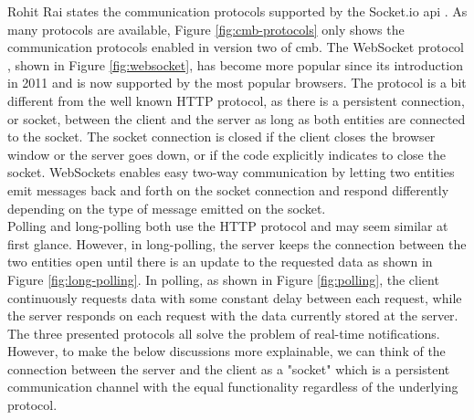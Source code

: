 Rohit Rai states the communication protocols supported by the Socket.io \gls{api} \cite{Rai2013}. As many protocols are available, Figure \ref{fig:cmb-protocols} only shows the communication protocols enabled in version two of \gls{cmb}. The WebSocket protocol \cite{a:Fette2011}, shown in Figure \ref{fig:websocket}, has become more popular since its introduction in 2011 and is now supported by the most popular browsers. The protocol is a bit different from the well known HTTP protocol, as there is a persistent connection, or socket, between the client and the server as long as both entities are connected to the socket. The socket connection is closed if the client closes the browser window or the server goes down, or if the code explicitly indicates to close the socket. WebSockets enables easy two-way communication by letting two entities emit messages back and forth on the socket connection and respond differently depending on the type of message emitted on the socket. \\

Polling and long-polling both use the HTTP protocol and may seem similar at first glance. However, in long-polling, the server keeps the connection between the two entities open until there is an update to the requested data as shown in Figure \ref{fig:long-polling}. In polling, as shown in Figure \ref{fig:polling}, the client continuously requests data with some constant delay between each request, while the server responds on each request with the data currently stored at the server. The three presented protocols all solve the problem of real-time notifications. However, to make the below discussions more explainable, we can think of the connection between the server and the client as a "socket" which is a persistent communication channel with the equal functionality regardless of the underlying protocol. \\

